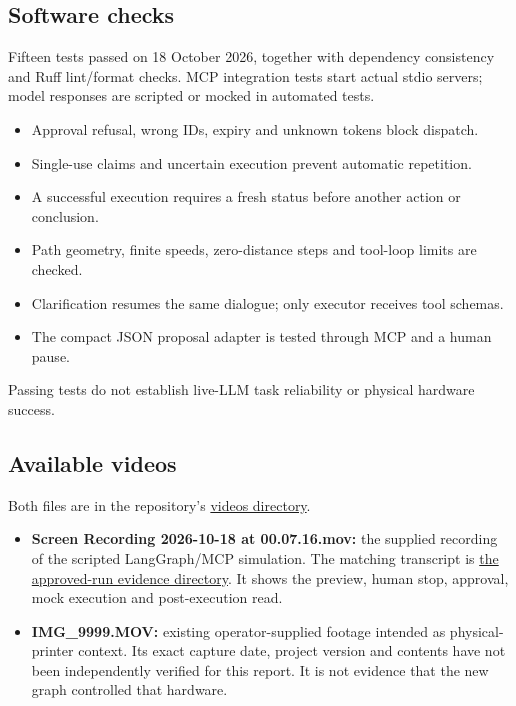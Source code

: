 \documentclass[11pt,a4paper]{article}
\newcommand{\repo}{https://github.com/Arenananyan/photonicsai-homework-3}
\newcommand{\evidence}[2]{\href{https://github.com/Arenananyan/photonicsai-homework-3/tree/main/docs/evidence/#1}{#2}}
\begin{document}
\subsection{Software checks}
Fifteen tests passed on 18 October 2026, together with dependency consistency and
Ruff lint/format checks. MCP integration tests start actual stdio servers; model
responses are scripted or mocked in automated tests.
\begin{itemize}
\item Approval refusal, wrong IDs, expiry and unknown tokens block dispatch.
\item Single-use claims and uncertain execution prevent automatic repetition.
\item A successful execution requires a fresh status before another action or conclusion.
\item Path geometry, finite speeds, zero-distance steps and tool-loop limits are checked.
\item Clarification resumes the same dialogue; only executor receives tool schemas.
\item The compact JSON proposal adapter is tested through MCP and a human pause.
\end{itemize}
Passing tests do not establish live-LLM task reliability or physical hardware success.

\subsection{Available videos}
Both files are in the repository's \href{\repo/tree/main/videos}{videos directory}.
\begin{itemize}
\item \textbf{Screen Recording 2026-10-18 at 00.07.16.mov:} the supplied recording
of the scripted LangGraph/MCP simulation. The matching transcript is
\evidence{simulation-approved}{the approved-run evidence directory}. It shows the preview, human stop,
approval, mock execution and post-execution read.
\item \textbf{IMG\_9999.MOV:} existing operator-supplied footage intended as
physical-printer context. Its exact capture date, project version and contents
have not been independently verified for this report. It is not evidence that
the new graph controlled that hardware.
\end{itemize}
\end{document}
